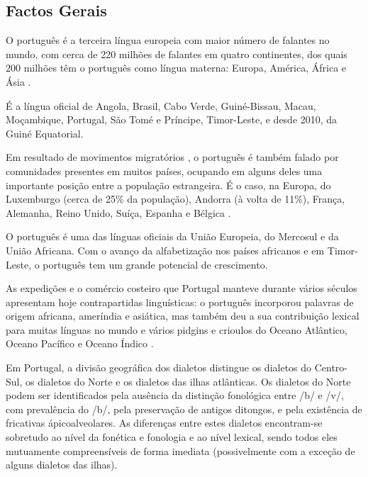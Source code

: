 \begin{multicols}{2}

\subsection{Factos Gerais}

O português é a terceira língua europeia com maior número de falantes no mundo, com cerca de 220 milhões de falantes em quatro continentes, dos quais 200 milhões têm o português como língua materna: Europa, América, África e Ásia \cite{observatorio}  \cite{ethnologue}.

É a língua oficial de Angola, Brasil, Cabo Verde, Guiné-Bissau, Macau, Moçambique, Portugal, São Tomé e Príncipe, Timor-Leste, e desde 2010, da Guiné Equatorial. 


Em resultado de movimentos migratórios  \cite{stat1} \cite{obsemig}, o português é também falado por comunidades presentes em muitos países, ocupando em alguns deles uma importante posição entre a população estrangeira. É o caso, na Europa, do Luxemburgo (cerca de 25\% da população), Andorra (à volta de 11\%), França, Alemanha, Reino Unido, Suíça, Espanha e Bélgica \cite{linha}.

O português é uma das línguas oficiais da União Europeia, do Mercosul e da União Africana. Com o avanço da alfabetização nos países africanos e em Timor-Leste, o português tem um grande potencial de crescimento.

As expedições e o comércio costeiro que Portugal manteve durante vários séculos apresentam hoje contrapartidas linguísticas: o português incorporou palavras de origem africana, ameríndia e asiática, mas também deu a sua contribuição lexical para muitas línguas no mundo e vários pidgins e crioulos do Oceano Atlântico, Oceano Pacífico e Oceano Índico \cite{andrade}  \cite{camoes}. 

Em Portugal, a divisão geográfica dos dialetos \cite{cintra} distingue os dialetos do Centro-Sul, os dialetos do Norte e os dialetos das ilhas atlânticas. 
Os dialetos do Norte podem ser identificados pela ausência da distinção fonológica entre /b/ e /v/, 
com prevalência do /b/, pela preservação de antigos ditongos, e pela existência de fricativas ápicoalveolares. 
As diferenças entre estes dialetos encontram-se sobretudo ao nível da fonética e fonologia e ao nível lexical, sendo
todos eles mutuamente compreensíveis de forma imediata (possivelmente com a exceção de alguns dialetos das ilhas). 


\end{multicols}
